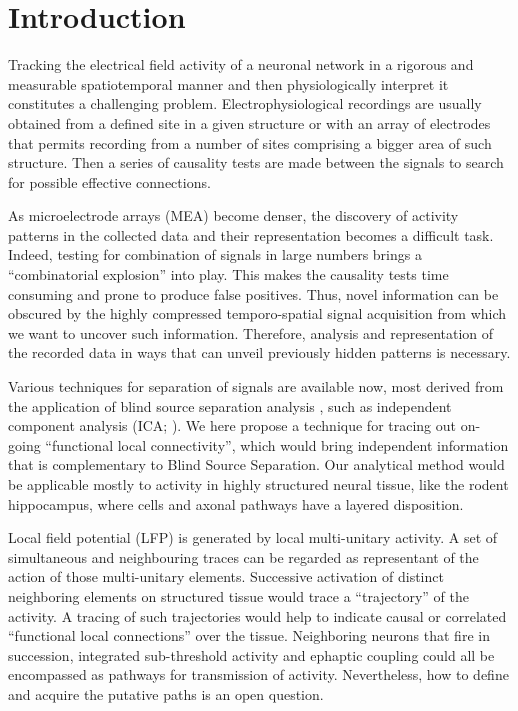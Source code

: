 \documentclass[letterpaper,12pts]{article}
\begin{document}
\section{Introduction}

Tracking the electrical field activity of a neuronal network in a rigorous and
measurable spatiotemporal manner and then physiologically interpret it constitutes
a challenging problem. 
Electrophysiological recordings are usually obtained from a defined site in a given structure or with an array of electrodes that permits recording from a number of sites comprising a bigger area of such structure. Then a series of causality tests are made between the signals to search for possible effective connections. 

As microelectrode arrays (MEA) become denser, the discovery of activity patterns in the collected data and their representation becomes a difficult task. Indeed, testing for combination of signals in large numbers brings a ``combinatorial explosion'' into play. This makes the causality tests time consuming and prone to produce false positives. Thus, novel information can be obscured by the highly compressed temporo-spatial signal acquisition from which we want to uncover such information. Therefore, analysis and representation of the recorded data in ways that can unveil previously hidden patterns is necessary. 

Various techniques for separation of signals
are available now, most derived from the application of blind source
separation analysis \cite{Bell1995}, such as independent component analysis (ICA; \cite{Comon2010}). We here propose a technique for tracing out on-going ``functional local connectivity'', which would bring independent information that is complementary to Blind Source Separation. Our analytical method would be applicable mostly to activity in highly structured neural tissue, like the rodent hippocampus, where cells and axonal pathways have a layered disposition.

Local field potential (LFP)
is generated by local multi-unitary activity.
A set of simultaneous and neighbouring traces
can be regarded as representant of the action
of those multi-unitary elements. 
Successive activation  of distinct neighboring elements on structured
tissue would trace a
``trajectory'' of the activity. A tracing of such trajectories would help to indicate
causal or correlated ``functional local connections'' over the tissue. Neighboring
neurons that fire in succession, integrated sub-threshold activity and ephaptic coupling
could all be encompassed as pathways for transmission of activity. Nevertheless,
how to define and acquire the putative paths is an open question.
\end{document}
